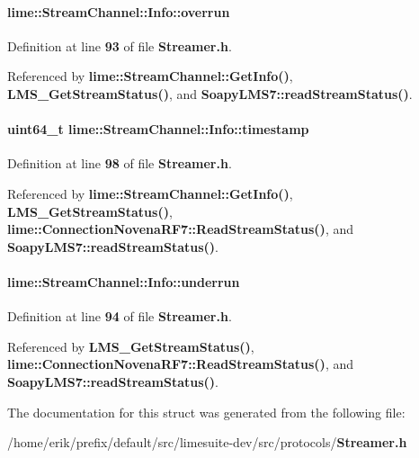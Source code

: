 \paragraph[{overrun}]{ lime\+::\+Stream\+Channel\+::\+Info\+::overrun}\label{structlime_1_1StreamChannel_1_1Info_a8433b7cc7cb1d654d747401aa7b5fee8}


Definition at line {\bf 93} of file {\bf Streamer.\+h}.



Referenced by {\bf lime\+::\+Stream\+Channel\+::\+Get\+Info()}, {\bf L\+M\+S\+\_\+\+Get\+Stream\+Status()}, and {\bf Soapy\+L\+M\+S7\+::read\+Stream\+Status()}.

\paragraph[{timestamp}]{\setlength{\rightskip}{0pt plus 5cm}uint64\+\_\+t lime\+::\+Stream\+Channel\+::\+Info\+::timestamp}\label{structlime_1_1StreamChannel_1_1Info_a1c44b39790bb37174640c0fac3be7fd9}


Definition at line {\bf 98} of file {\bf Streamer.\+h}.



Referenced by {\bf lime\+::\+Stream\+Channel\+::\+Get\+Info()}, {\bf L\+M\+S\+\_\+\+Get\+Stream\+Status()}, {\bf lime\+::\+Connection\+Novena\+R\+F7\+::\+Read\+Stream\+Status()}, and {\bf Soapy\+L\+M\+S7\+::read\+Stream\+Status()}.

\paragraph[{underrun}]{ lime\+::\+Stream\+Channel\+::\+Info\+::underrun}\label{structlime_1_1StreamChannel_1_1Info_a8e4e28d1755358f0ee89cba292598ce0}


Definition at line {\bf 94} of file {\bf Streamer.\+h}.



Referenced by {\bf L\+M\+S\+\_\+\+Get\+Stream\+Status()}, {\bf lime\+::\+Connection\+Novena\+R\+F7\+::\+Read\+Stream\+Status()}, and {\bf Soapy\+L\+M\+S7\+::read\+Stream\+Status()}.



The documentation for this struct was generated from the following file\+:\begin{DoxyCompactItemize}
\item 
/home/erik/prefix/default/src/limesuite-\/dev/src/protocols/{\bf Streamer.\+h}\end{DoxyCompactItemize}
